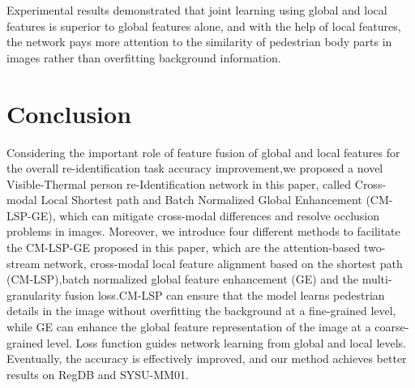 \documentclass[journal]{IEEEtran}
\begin{document}
Experimental results demonstrated that joint learning using global and local features is superior to global features alone, and with the help of local features, the network pays more attention to the similarity of pedestrian body parts in images rather than overfitting background information.

\section{Conclusion}
\label{sec:conclusion}
Considering the important role of feature fusion of global and local features for the overall re-identification task accuracy improvement,we proposed a novel Visible-Thermal person re-Identification network in this paper, called Cross-modal Local Shortest path and Batch Normalized Global Enhancement (CM-LSP-GE), which can mitigate cross-modal differences and resolve occlusion problems in images. Moreover, we introduce four different methods to facilitate the CM-LSP-GE proposed in this paper, which are the attention-based two-stream network, cross-modal local feature alignment based on the shortest path (CM-LSP),batch normalized global feature enhancement (GE) and the multi-granularity fusion loss.CM-LSP can ensure that the model learns pedestrian details in the image without overfitting the background at a fine-grained level, while GE can enhance the global feature representation of the image at a coarse-grained level. Loss function guides network learning from global and local levels. Eventually, the accuracy is effectively improved, and our method achieves better results on RegDB and SYSU-MM01.

{\small
		
		
	}
	
	
\end{document}

